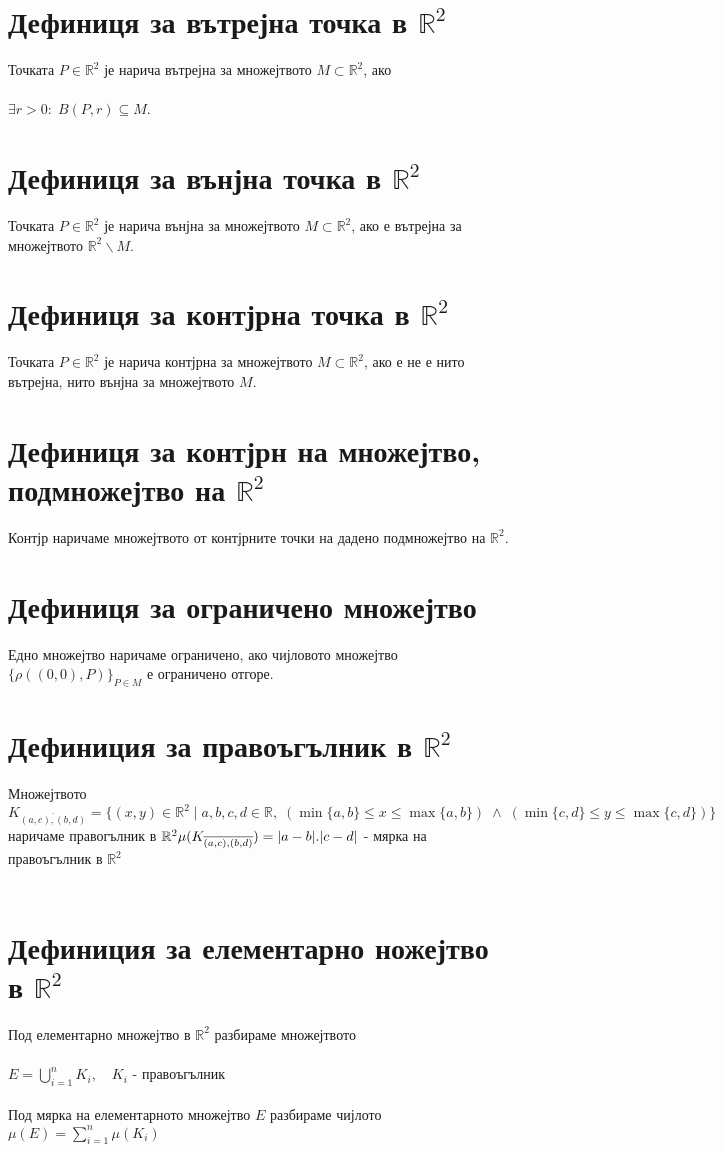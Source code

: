 \documentclass[14pt]{extarticle}
\newcommand{\R}{\mathbb{R}}
\newcommand{\Sum}{\displaystyle\sum}
\begin{document}
\section*{Дефиниця за вътрејна точка в \(\R^2\)}
Точката \(P \in \R^2\) је нарича вътрејна за множејтвото \(M \subset \R^2\), ако \\\\
\(\exists r > 0 : \; B(P,r) \subseteq M\).
\section*{Дефиниця за вънјна точка в \(\R^2\)}
Точката \(P \in \R^2\) је нарича вънјна за множејтвото \(M \subset \R^2\), ако е вътрејна за множејтвото \(\R^2\backslash M\).
\section*{Дефиниця за контјрна точка в \(\R^2\)}
Точката \(P \in \R^2\) је нарича контјрна за множејтвото \(M \subset \R^2\), ако е не е нито вътрејна, нито вънјна за множејтвото \(M\).
\section*{Дефиниця за контјрн на множејтво, подмножејтво на \(\R^2\)}
Контјр наричаме множејтвото от контјрните точки на дадено подмножејтво на \(\R^2\).
\section*{Дефиниця за ограничено множејтво}
Едно множејтво наричаме ограничено, ако чијловото множејтво \(\{\rho((0, 0), P)\}_{P \in M}\) е ограничено отгоре.
\section*{Дефиниция за правоъгълник в \(\R^2\)}
Множејтвото \(K_{\overline{(a, c), (b, d)}} = \{(x, y) \in \R^2 \; | \; a, b, c, d \in \R, \;  (\min\{a, b\} \leq x \leq \max\{a, b\}) \; \land \; (\min\{c, d\} \leq y \leq \max\{c, d\}) \}\) наричаме правогълник в \(\R^2 \\\\
\mu(K_{\overline{(a, c), (b, d)}}) = |a - b|.|c - d|\) - мярка на правоъгълник в \(\R^2\) \\\\
\section*{Дефиниция за елементарно ножејтво в \(\R^2\)}
Под елементарно множејтво в \(\R^2\) разбираме множејтвото \\\\
\(E = \bigcup_{i = 1}^n K_i, \quad K_i\) - правоъгълник \\\\
Под мярка на елементарното множејтво \(E\) разбираме чијлото \(\mu(E) = \Sum_{i = 1}^n \mu(K_i)\)
\end{document}
